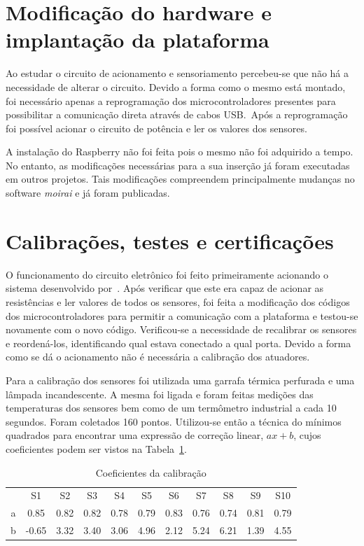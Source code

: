 \section{Modificação do hardware e implantação da plataforma}%
\label{sec:hardware-and-plataform}

Ao estudar o circuito de acionamento e sensoriamento percebeu-se que não há a
necessidade de alterar o circuito. Devido a forma como o mesmo está montado, foi
necessário apenas a reprogramação dos microcontroladores presentes para
possibilitar a comunicação direta através de cabos USB.\ Após a reprogramação
foi possível acionar o circuito de potência e ler os valores dos sensores.

A instalação do Raspberry não foi feita pois o mesmo não foi adquirido a tempo.
No entanto, as modificações necessárias para a sua inserção já foram executadas
em outros projetos. Tais modificações compreendem principalmente mudanças no
software \textit{moirai} e já foram publicadas.

\section{Calibrações, testes e certificações}%
\label{sec:calibration}

O funcionamento do circuito eletrônico foi feito primeiramente acionando o
sistema desenvolvido por~\textcite{masterthesis:nelson}. Após verificar que este
era capaz de acionar as resistências e ler valores de todos os sensores, foi
feita a modificação dos códigos dos microcontroladores para permitir a
comunicação com a plataforma e testou-se novamente com o novo código.
Verificou-se a necessidade de recalibrar os sensores e reordená-los,
identificando qual estava conectado a qual porta. Devido a forma como se dá o
acionamento não é necessária a calibração dos atuadores.

Para a calibração dos sensores foi utilizada uma garrafa térmica perfurada e uma
lâmpada incandescente. A mesma foi ligada e foram feitas medições das
temperaturas dos sensores bem como de um termômetro industrial a cada 10
segundos. Foram coletados 160 pontos. Utilizou-se então a técnica do mínimos
quadrados para encontrar uma expressão de correção linear, \( ax+b \), cujos
coeficientes podem ser vistos na Tabela~\ref{tbl:calib-coefs}.

\begin{table}[ht!]
    \centering
    \caption{Coeficientes da calibração}%
    \label{tbl:calib-coefs}
    \begin{tabular}{ccccccccccc}
          & S1    & S2   & S3   & S4   & S5   & S6   & S7   & S8   & S9   & S10  \\
        a & 0.85  & 0.82 & 0.82 & 0.78 & 0.79 & 0.83 & 0.76 & 0.74 & 0.81 & 0.79 \\
        b & -0.65 & 3.32 & 3.40 & 3.06 & 4.96 & 2.12 & 5.24 & 6.21 & 1.39 & 4.55
    \end{tabular}
\end{table}

